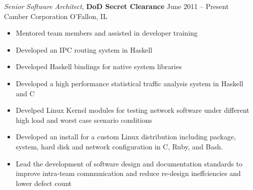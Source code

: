 \documentclass[margin,line]{resume}
\begin{document}
\begin{resume}
{\sl Senior Software Architect}, \textbf{\small DoD Secret Clearance}   \hfill
June 2011 -- Present\\
Camber Corporation \hfill  O'Fallon, IL
\begin{itemize} \itemsep -2pt %
\small\item Mentored team members and assisted in developer training
\small\item Developed an IPC routing system in Haskell
\small\item Developed Haskell bindings for native system libraries
\small\item Developed a high performance statistical traffic analysis system in
    Haskell and C
\small\item Develped Linux Kernel modules for testing network software under
    different high load and worst case scenario conditions
\small\item Developed an install for a custom Linux distribution including
    package, system, hard disk and network configuration in C, Ruby, and Bash.
\small\item Lead the development of software design and documentation standards
    to improve intra-team communication and reduce re-design ineffciencies and
    lower defect count
\end{itemize}


\end{resume}
\end{document}
